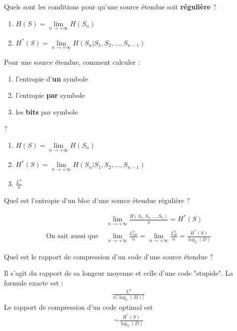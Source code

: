 \documentclass[12pt]{article}
\newcommand*{\xfield}[1]{\begin{mdframed}\centering #1\end{mdframed}\bigskip}
\newenvironment{note}{}{}
\begin{document}
\begin{note}
	\xfield{Quels sont les conditions pour qu'une source étendue soit \textbf{régulière} ?}
	\xfield{\begin{enumerate}
	\item $H(S) = \lim\limits_{n \to +\infty} H(S_n)$
	\item $H^*(S) = \lim\limits_{n \to +\infty} H(S_n|S_1,S_2,\hdots,S_{n-1})$
	\end{enumerate}}
\end{note}

\begin{note}
	\xfield{Pour une source étendue, comment calculer :
	\begin{enumerate}
	\item l'entropie d'\textbf{un} symbole
	\item l'entropie \textbf{par} symbole
	\item les \textbf{bits} par symbole 
	\end{enumerate} ?}
	\xfield{\begin{enumerate}
	\item $H(S) = \lim\limits_{n \to +\infty} H(S_n)$
	\item $H^*(S) = \lim\limits_{n \to +\infty} H(S_n|S_1,S_2,\hdots,S_{n-1})$
	\item $\frac{L^n}{n}$
	\end{enumerate} }
\end{note}

\begin{note}
	\xfield{Quel est l'entropie d'un bloc d'une source étendue régulière ?}
	\xfield{\begin{align*}
	&\lim\limits_{n \to +\infty} \frac{H(S_1,S_2,\hdots,S_n)}{n} = H^*(S)\\
	\text{On sait aussi que } &\lim\limits_{n \to +\infty} \frac{L^n_{SF}}{n}=\lim\limits_{n \to +\infty}\frac{L^n_H}{n}=\frac{H^*(S)}{\log_2(D)}
	\end{align*}}
\end{note}

\begin{note}
	\xfield{Quel est le rapport de compression d'un code d'une source étendue ?}
	\xfield{Il s'agit du rapport de sa longeur moyenne et celle d'une code "stupide". La formule exacte est :
	\begin{align*}
		\frac{L^n}{n\lceil\log_2(M)\rceil}
	\end{align*}
	Le rapport de compression d'un code optimal est 
	\begin{align*}
		\sim \frac{H^*(S)}{\log_2(D)}
	\end{align*}}
\end{note}
\end{document}
